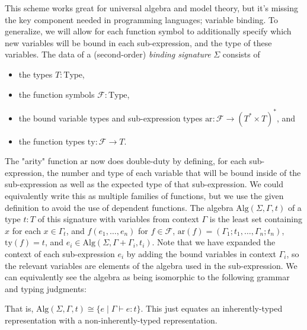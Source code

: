 \documentclass{article}
\theoremstyle{definition}
\begin{document}
This scheme works great for universal algebra and model theory, but it's missing the key component needed in programming languages; variable binding. To generalize, we will allow for each function symbol to additionally specify which new variables will be bound in each sub-expression, and the type of these variables. The data of a (second-order) \emph{binding signature} $\Sigma$ consists of
\begin{itemize}
	\item the types $T : \text{Type}$,
	\item the function symbols $\mathcal{F} : \text{Type}$,
	\item the bound variable types and sub-expression types $\text{ar} : \mathcal{F} \rightarrow (T^* \times T)^*$, and
	\item the function types $\text{ty} : \mathcal{F} \rightarrow T$.
\end{itemize}
The "arity" function $\text{ar}$ now does double-duty by defining, for each sub-expression, the number and type of each variable that will be bound inside of the sub-expression as well as the expected type of that sub-expression. We could equivalently write this as multiple families of functions, but we use the given definition to avoid the use of dependent functions. The algebra $\text{Alg}(\Sigma,\Gamma,t)$ of a type $t : T$ of this signature with variables from context $\Gamma$ is the least set containing $x$ for each $x \in \Gamma_t$, and $f(e_1,\ldots,e_n)$ for $f \in \mathcal{F}$, $\text{ar}(f) = (\Gamma_1;t_1,\ldots,\Gamma_n;t_n)$, $\text{ty}(f) = t$, and $e_i \in \text{Alg}(\Sigma,\Gamma+\Gamma_i,t_i)$. Note that we have expanded the context of each sub-expression $e_i$ by adding the bound variables in context $\Gamma_i$, so the relevant variables are elements of the algebra used in the sub-expression. We can equivalently see the algebra as being isomorphic to the following grammar and typing judgments:
\begin{syntax}
\end{syntax}
That is, $\text{Alg}(\Sigma,\Gamma,t) \cong \{e \mid \Gamma \vdash e : t\}$. This just equates an inherently-typed representation with a non-inherently-typed representation.
\end{document}
